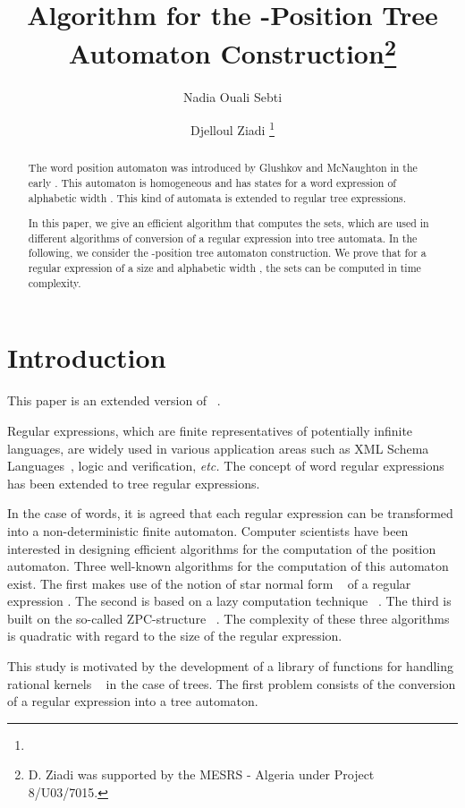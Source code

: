 \documentclass{llncs}
\title{Algorithm for the -Position Tree Automaton Construction\thanks{D. Ziadi was supported by the MESRS - Algeria under Project 8/U03/7015.}}
\author{Nadia Ouali Sebti \and Djelloul Ziadi \thanks{\email{Nadia.Ouali-Sebti, Djelloul.Ziadi@univ-rouen.fr}}}
\institute{Laboratoire LITIS - EA 4108 Universit\'e de Rouen, Avenue de l'Universit\'e \\76801 Saint-\'Etienne-du-Rouvray Cedex.}
\date{}
\begin{document}
\setcounter{footnote}{0}
\maketitle             
\begin{abstract}
The word position automaton was introduced by Glushkov and McNaughton in the early . This automaton
is homogeneous and has  states for a word expression of alphabetic width .
This kind of automata is extended to regular tree expressions.

In this paper, we give an efficient algorithm that computes the  sets, which are used in different algorithms of conversion of a regular expression into tree automata. In the following, we consider the -position tree automaton construction. We prove that for a regular expression  of a size  and alphabetic width , the  sets can be computed in  time complexity.   
\end{abstract}
\section{Introduction}

This paper is an extended version of ~\cite{Ouali}.

Regular expressions, which are finite representatives of potentially infinite languages, are widely used in various application areas such as XML Schema Languages~\cite{xml}, logic and verification, \emph{etc.} The concept of word regular expressions  has been extended to tree regular expressions. 


 In the case of words, it is agreed that each regular expression can be transformed into a non-deterministic finite automaton.
Computer scientists have been interested in designing efficient algorithms for the computation of the position automaton. 
Three well-known algorithms for the computation of this automaton exist. The first makes use 
of the notion of star normal form ~\cite{Brug} of a regular expression   . The second is based on a
lazy computation technique ~\cite{Paig}. The third is built on the so-called ZPC-structure ~\cite{ZPC}.
The complexity of these three algorithms is quadratic with regard to the size of the regular expression.


This study is motivated by the development of a library of functions for handling rational kernels ~\cite{mohri1} in the case of trees. The first problem consists of the conversion of a regular expression into a tree automaton. 
\end{document}
